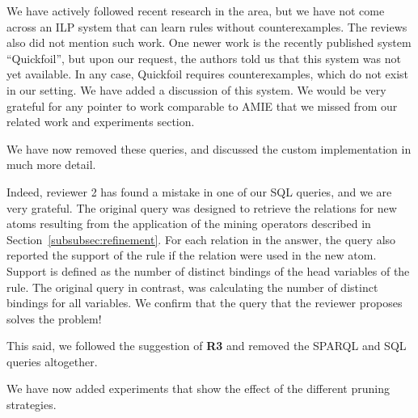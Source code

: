 We have actively followed recent research in the area, but we have not come across an ILP system that can learn rules without counterexamples. The reviews also did not mention such work. One newer work is the recently published system ``Quickfoil'', but upon our request, the authors told us that this system was not yet available. In any case, Quickfoil requires counterexamples, which do not exist in our setting. We have added a discussion of this system. We would be very grateful for any pointer to work comparable to AMIE that we missed from our related work and experiments section.


We have now removed these queries, and discussed the custom implementation in much more detail.


	  Indeed, reviewer 2 has found a mistake in one of our SQL queries, and we are very grateful. The original query was designed to retrieve the relations for new atoms resulting from the application of the mining operators described in Section~\ref{subsubsec:refinement}. For each relation in the answer, the query also reported the support of the rule if the relation were used in the new atom. Support is defined as the number of distinct bindings of the head variables of the rule. The original query in contrast, was calculating the number of distinct bindings for all variables. We confirm that the query that the reviewer proposes solves the problem! 

	  This said, we followed the suggestion of \textbf{R3} and removed the SPARQL and SQL queries altogether.


We have now added experiments that show the effect of the different pruning  strategies.



